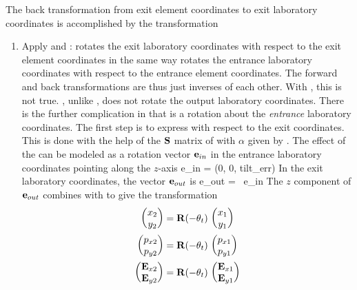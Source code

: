 The back transformation from exit element coordinates to exit
laboratory coordinates is accomplished by the transformation
  \begin{enumerate}
  \item
Apply  and :  rotates the exit
laboratory coordinates with respect to the exit element coordinates in
the same way  rotates the entrance laboratory coordinates
with respect to the entrance element coordinates. The forward and back
transformations are thus just inverses of each other.  With
, this is not true. , unlike , does
not rotate the output laboratory coordinates.  There is the further
complication in that  is a rotation about the {\em
entrance} laboratory coordinates. The first step is to express
 with respect to the exit coordinates. This is done with
the help of the ${\bf S}$ matrix of  with $\alpha$ given by
. The effect of the  can be modeled as a rotation
vector ${\bf e}_{in}$ in the entrance laboratory coordinates pointing
along the $z$-axis
\Begineq
 \Bf e_{in} = (0, 0, \mbox{tilt_err})
\Endeq
In the exit laboratory coordinates, the vector ${\bf e}_{out}$ is
\Begineq
  \Bf e_{out} = \bfS \, \Bf e_{in}
\Endeq
The $z$ component of ${\bf e}_{out}$ combines with  to give
the transformation
\begin{align}
  \begin{pmatrix} x_2 \\ y_2 \end{pmatrix} &=
    {\bf R} (-\theta_{t}) \,   \begin{pmatrix} x_1 \\ y_1 \end{pmatrix} \nonumber \\
  \begin{pmatrix} p_{x2} \\ p_{y2} \end{pmatrix} &=
    {\bf R} (-\theta_{t}) \,   \begin{pmatrix} p_{x1} \\ p_{y1} \end{pmatrix} \\
  \begin{pmatrix} {\bf E}_{x2} \\ {\bf E}_{y2} \end{pmatrix} &=
    {\bf R} (-\theta_{t}) \,   \begin{pmatrix} {\bf E}_{x1} \\ {\bf E}_{y1} \end{pmatrix} \nonumber
\end{align}

\end{enumerate}
